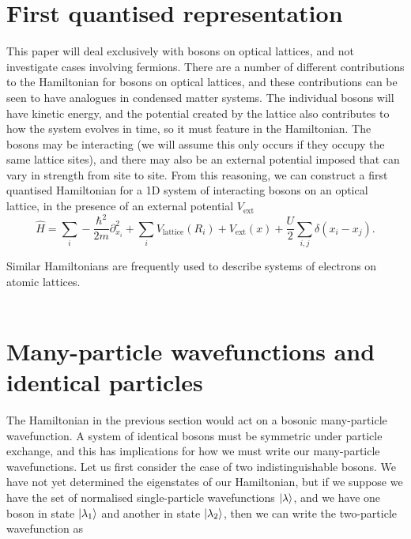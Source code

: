 \documentclass[a4paper,10pt]{article}
\begin{document}
\section{First quantised representation}
This paper will deal exclusively with bosons on optical lattices, and not investigate cases involving fermions.
There are a number of different contributions to the Hamiltonian for bosons on optical lattices, and these contributions can be seen to have analogues in condensed matter systems.
The individual bosons will have kinetic energy, and the potential created by the lattice also contributes to how the system evolves in time, so it must feature in the Hamiltonian.
The bosons may be interacting (we will assume this only occurs if they occupy the same lattice sites), and there may also be an external potential imposed that can vary in strength
from site to site. From this reasoning, we can construct a first quantised Hamiltonian for a 1D system of interacting bosons on an optical lattice, in the presence of an external potential $V_{\text{ext}}$
\begin{equation}
  \label{eq:HamiltonianCoordinateRepresentation}
 \hat{H}=\sum_{i}-\frac{\hbar^{2}}{2m}  \partial_{x_{i}}^2+\sum_{i}V_{\text{lattice}}(R_{i})+V_{\text{ext}}(x)+\frac{U}{2}\sum_{i,j}\delta(x_{i}-x_{j}).
\end{equation}

Similar Hamiltonians are frequently used to describe systems of electrons on atomic lattices.
\\\\


\section{Many-particle wavefunctions and identical particles \cite{Negele1988, Inkson1984, Altland2010}}
The Hamiltonian in the previous section would act on a bosonic many-particle wavefunction. A system of identical bosons must be symmetric under particle exchange, and this has 
implications for how we must write our many-particle wavefunctions. Let us first consider the case of two indistinguishable bosons. We have not yet determined the eigenstates 
of our Hamiltonian, but if we suppose we have the set of normalised single-particle wavefunctions $\ket{\lambda}$, and we have one boson in state $\ket{\lambda_1}$ and another
in state $\ket{\lambda_2}$, then we can write the two-particle wavefunction as
\end{document}
